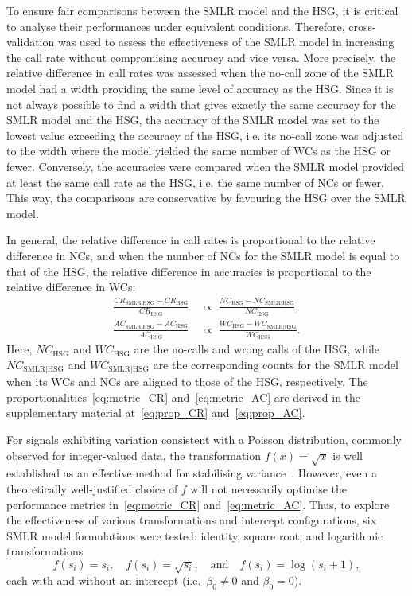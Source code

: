 \documentclass[preprint,5p,times,11pt]{elsarticle}
\begin{document}
To ensure fair comparisons between the SMLR model and the HSG, it is critical to analyse their performances under equivalent conditions.
Therefore, cross-validation was used to assess the effectiveness of the SMLR model in increasing the call rate without compromising accuracy and vice versa.
More precisely, the relative difference in call rates was assessed when the no-call zone of the SMLR model had a width providing the same level of accuracy as the HSG.
Since it is not always possible to find a width that gives exactly the same accuracy for the SMLR model and the HSG, the accuracy of the SMLR model was set to the lowest value exceeding the accuracy of the HSG, i.e. its no-call zone was adjusted to the width where the model yielded the same number of WCs as the HSG or fewer.
Conversely, the accuracies were compared when the SMLR model provided at least the same call rate as the HSG, i.e. the same number of NCs or fewer.
This way, the comparisons are conservative by favouring the HSG over the SMLR model.

In general, the relative difference in call rates is proportional to the relative difference in NCs, and when the number of NCs for the SMLR model is equal to that of the HSG, the relative difference in accuracies is proportional to the relative difference in WCs:
\begin{align}
\frac{CR_{\text{SMLR}\mid\text{HSG}} - CR_{\text{HSG}}}{CR_{\text{HSG}}} \; &\propto \; \frac{NC_{\text{HSG}} - NC_{\text{SMLR}\mid\text{HSG}}}{NC_{\text{HSG}}},\label{eq:metric_CR} \\
\frac{AC_{\text{SMLR}\mid\text{HSG}} - AC_{\text{HSG}}}{AC_{\text{HSG}}} \; &\propto \; \frac{WC_{\text{HSG}} - WC_{\text{SMLR}\mid\text{HSG}}}{WC_{\text{HSG}}}.\label{eq:metric_AC}
\end{align}
Here, $NC_{\text{HSG}}$ and $WC_{\text{HSG}}$ are the no-calls and wrong calls of the HSG, while $NC_{\text{SMLR}\mid\text{HSG}}$ and $WC_{\text{SMLR}\mid\text{HSG}}$ are the corresponding counts for the SMLR model when its WCs and NCs are aligned to those of the HSG, respectively.
The proportionalities~\eqref{eq:metric_CR} and~\eqref{eq:metric_AC} are derived in the supplementary material at~\eqref{eq:prop_CR} and~\eqref{eq:prop_AC}.

For signals exhibiting variation consistent with a Poisson distribution, commonly observed for integer-valued data, the transformation $f(x) = \sqrt{x}$ is well established as an effective method for stabilising variance~\cite{bartlett}.
However, even a theoretically well-justified choice of $f$ will not necessarily optimise the performance metrics in~\eqref{eq:metric_CR} and~\eqref{eq:metric_AC}.
Thus, to explore the effectiveness of various transformations and intercept configurations, six SMLR model formulations were tested: identity, square root, and logarithmic transformations
\begin{equation*}
f(s_i) = s_i, \quad f(s_i) = \sqrt{s_i}, \quad \text{and} \quad f(s_i) = \log(s_i+1),
\end{equation*}
each with and without an intercept (i.e.~$\beta_0 \neq 0$ and $\beta_0 = 0$).
\end{document}
